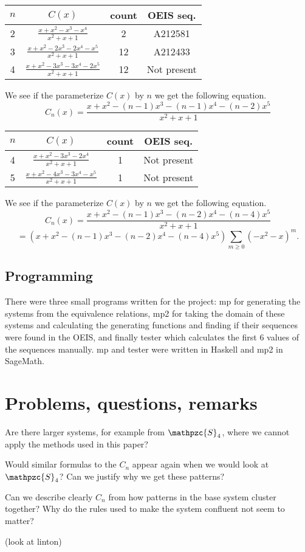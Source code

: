 \documentclass[a4paper, 11pt]{article}
\theoremstyle{definition}
\newcommand{\Sym}{\mathpzc{S}}
\begin{document}
\begin{center}
\begin{tabular}{c|c|c|c}
    $n$ & $C(x)$ & count & OEIS seq. \\
    \hline
    2 & $\frac{x+x^2-x^3-x^4}{x^2+x+1}$ & 2 & A212581 \\
    3 & $\frac{x+x^2-2x^3-2x^4-x^5}{x^2+x+1}$ & 12 & A212433 \\
    4 & $\frac{x+x^2-3x^3-3x^4-2x^5}{x^2+x+1}$ & 12 & Not present\\
\end{tabular}
\end{center}
We see if the parameterize $C(x)$ by $n$ we get the following equation.
\[
    C_n(x) = \frac{x+x^2-(n-1)x^3-(n-1)x^4-(n-2)x^5}{x^2+x+1}
\]

\begin{center}
\begin{tabular}{c|c|c|c}
    $n$ & $C(x)$ & count & OEIS seq. \\
    \hline
    4 & $\frac{x+x^2-3x^3-2x^4}{x^2+x+1}$ & 1 & Not present \\ 
    5 & $\frac{x+x^2-4x^3-3x^4-x^5}{x^2+x+1}$ & 1 & Not present\\
\end{tabular}
\end{center}
We see if the parameterize $C(x)$ by $n$ we get the following equation.
\[
    C_n(x) = \frac{x+x^2-(n-1)x^3-(n-2)x^4-(n-4)x^5}{x^2+x+1}
\]
\[
    = (x+x^2-(n-1)x^3-(n-2)x^4-(n-4)x^5)\sum_{m \geq 0}(-x^2-x)^m.
\]


\subsection{Programming}
There were three small programs written for the project: mp for generating the
systems from the equivalence relations, mp2 for taking the domain of these
systems and calculating the generating functions and finding if their sequences
were found in the OEIS, and finally tester which calculates the first 6 values
of the sequences manually. mp and tester were written in Haskell and mp2 in SageMath. 


\section{Problems, questions, remarks}
Are there larger systems, for example from $\Sym_4$, where we cannot apply the
methods used in this paper?

Would similar formulas to the $C_n$ appear again when we would
look at $\Sym_4$? Can we justify why we get these patterns?

Can we describe clearly $C_n$ from how patterns in the base system cluster together?
Why do the rules used to make the system confluent not seem to matter?

(look at linton)



\end{document}
